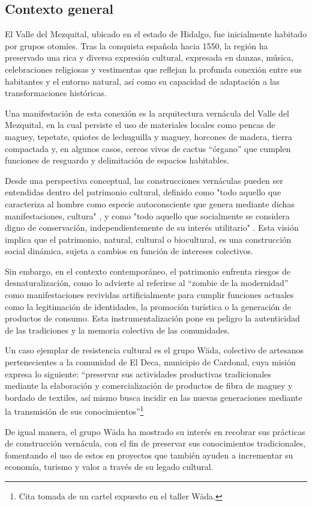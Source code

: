 \subsection{Contexto general}

El Valle del Mezquital, ubicado en el estado de Hidalgo, fue inicialmente habitado por grupos otomíes. Tras la conquista española hacia 1550, la región ha preservado una rica y diversa expresión cultural, expresada en danzas, música, celebraciones religiosas y vestimentas que reflejan la profunda conexión entre sus habitantes y el entorno natural, así como su capacidad de adaptación a las transformaciones históricas.

Una manifestación de esta conexión es la arquitectura vernácula del Valle del Mezquital, en la cual persiste el uso de materiales locales como pencas de maguey, tepetate, quiotes de lechuguilla y maguey, horcones de madera, tierra compactada y, en algunos casos, cercos vivos de cactus ``órgano'' que cumplen funciones de resguardo y delimitación de espacios habitables.

Desde una perspectiva conceptual, las construcciones vernáculas pueden ser entendidas dentro del patrimonio cultural, definido como "todo aquello que caracteriza al hombre como especie autoconsciente que genera mediante dichas manifestaciones, cultura" \citep{dominguez2004pautas}, y como "todo aquello que socialmente se considera digno de conservación, independientemente de su interés utilitario" \citep[p. 63]{prats1998concepto}. Esta visión implica que el patrimonio, natural, cultural o biocultural, es una construcción social dinámica, sujeta a cambios en función de intereses colectivos.

Sin embargo, en el contexto contemporáneo, el patrimonio enfrenta riesgos de desnaturalización, como lo advierte \cite{i2008zombi} al referirse al ``zombie de la modernidad'' como manifestaciones revividas artificialmente para cumplir funciones actuales como la legitimación de identidades, la promoción turística o la generación de productos de consumo. Esta instrumentalización pone en peligro la autenticidad de las tradiciones y la memoria colectiva de las comunidades.

Un caso ejemplar de resistencia cultural es el grupo Wäda, colectivo de artesanos pertenecientes a la comunidad de El Deca, municipio de Cardonal, cuya misión expresa lo siguiente: ``preservar sus actividades productivas tradicionales mediante la elaboración y comercialización de productos de fibra de maguey y bordado de textiles, así mismo busca incidir en las nuevas generaciones mediante la transmisión de sus conocimientos''\footnote{Cita tomada de un cartel expuesto en el taller Wäda.}

De igual manera, el grupo Wäda ha mostrado su interés en recobrar sus prácticas de construcción vernácula, con el fin de preservar sus conocimientos tradicionales, fomentando el uso de estos en proyectos que también ayuden a incrementar su economía, turismo y valor a través de su legado cultural.

